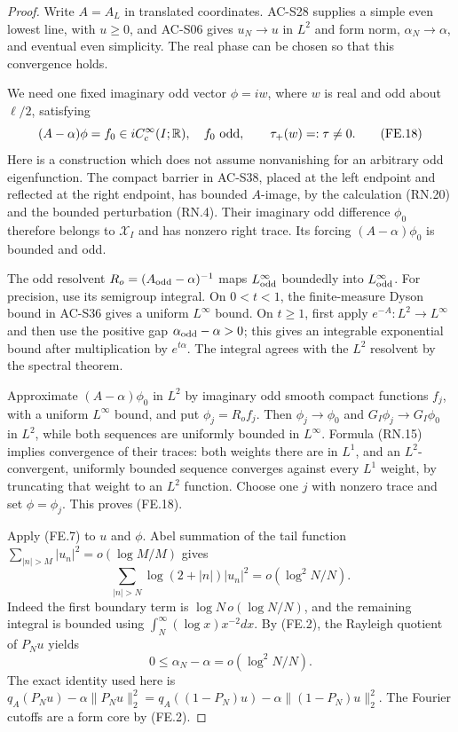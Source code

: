 \begin{proof}
Write \(A=A_L\) in translated coordinates.  AC-S28 supplies a
simple even lowest line, with \(u\geq0\), and AC-S06 gives
\(u_N\to u\) in \(L^2\) and form norm, \(\alpha_N\to\alpha\),
and eventual even simplicity.  The real phase can be chosen so
that this convergence holds.

We need one fixed imaginary odd vector \(\phi=iw\), where \(w\)
is real and odd about \(\ell/2\), satisfying
\[
 (A-\alpha)\phi=f_0\in iC_c^\infty(I;\mathbb R),\quad
 f_0\hbox{ odd},\qquad \tau_+(w)=:\tau\ne0.               \tag{FE.18}
\]
Here is a construction which does not assume nonvanishing for an
arbitrary odd eigenfunction.  The compact barrier in AC-S38,
placed at the left endpoint and reflected at the right endpoint,
has bounded \(A\)-image, by the calculation (RN.20) and the
bounded perturbation (RN.4).  Their imaginary odd difference
\(\phi_0\) therefore belongs to \(\mathcal X_I\) and has nonzero
right trace.  Its forcing \((A-\alpha)\phi_0\) is bounded and odd.

The odd resolvent \(R_o=(A_{\rm odd}-\alpha)^{-1}\) maps
\(L^\infty_{\rm odd}\) boundedly into \(L^\infty_{\rm odd}\).
For precision, use its semigroup integral.  On \(0<t<1\),
the finite-measure Dyson bound in AC-S36 gives a uniform
\(L^\infty\) bound.  On \(t\geq1\), first apply
\(e^{-A}:L^2\to L^\infty\) and then use the positive gap
\(\alpha_{\rm odd}-\alpha>0\); this gives an integrable
exponential bound after multiplication by \(e^{t\alpha}\).
The integral agrees with the \(L^2\) resolvent by the spectral
theorem.

Approximate \((A-\alpha)\phi_0\) in \(L^2\) by imaginary odd
smooth compact functions \(f_j\), with a uniform \(L^\infty\)
bound, and put \(\phi_j=R_of_j\).
Then \(\phi_j\to\phi_0\) and \(G_I\phi_j\to G_I\phi_0\)
in \(L^2\), while both sequences are uniformly bounded in
\(L^\infty\).  Formula (RN.15) implies convergence of their
traces: both weights there are in \(L^1\), and an \(L^2\)-convergent,
uniformly bounded sequence converges against every \(L^1\) weight,
by truncating that weight to an \(L^2\) function.
Choose one \(j\) with nonzero trace and set \(\phi=\phi_j\).
This proves (FE.18).

Apply (FE.7) to \(u\) and \(\phi\).
Abel summation of the tail function
\(\sum_{|n|>M}|u_n|^2=o(\log M/M)\) gives
\[
 \sum_{|n|>N}\log(2+|n|)|u_n|^2=o(\log^2N/N).
\]
Indeed the first boundary term is
\(\log N\,o(\log N/N)\), and the remaining integral is
bounded using \(\int_N^\infty (\log x)x^{-2}dx\).
By (FE.2), the Rayleigh quotient of \(P_Nu\) yields
\[
                 0\leq\alpha_N-\alpha=o(\log^2N/N).
                                                        \tag{FE.19}
\]
The exact identity used here is
\(q_A(P_Nu)-\alpha\|P_Nu\|_2^2
 =q_A((1-P_N)u)-\alpha\|(1-P_N)u\|_2^2\).
The Fourier cutoffs are a form core by (FE.2).


\end{proof}
